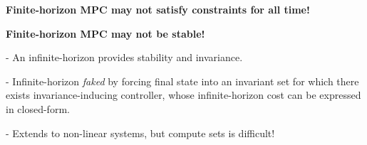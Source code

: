 

\begin{sstOnlyFrame}[ForestGreen!20]

	\textbf{Finite-horizon MPC may not satisfy constraints for all time!}

	\textbf{Finite-horizon MPC may not be stable!}

	-	An infinite-horizon provides stability and invariance.

	-	Infinite-horizon \textit{faked} by forcing final state
	into an invariant set for which there exists
	invariance-inducing controller,
	whose infinite-horizon cost can be expressed in closed-form.

	-	Extends to non-linear systems, but compute sets is difficult!
\end{sstOnlyFrame}
